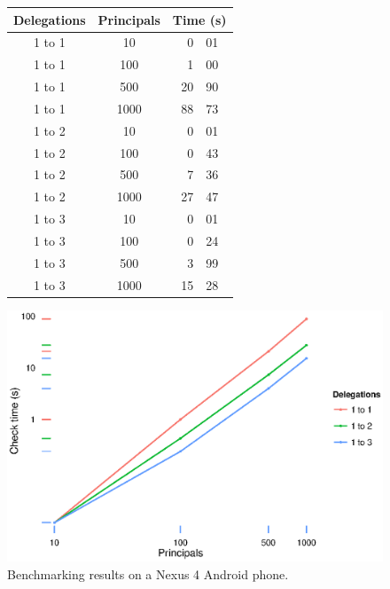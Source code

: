 \documentclass[]{llncs}
\begin{document}
\begin{figure}
  \centering
  \begin{minipage}{0.40\linewidth}
    \scriptsize
    \begin{tabular*}{0.80\linewidth}{c c r@{.}l}
      \toprule
      Delegations & Principals & \multicolumn{2}{c}{Time (s)} \\
      \midrule
      1 to 1 & 10   &  0&01 \\
      1 to 1 & 100  &  1&00 \\
      1 to 1 & 500  & 20&90 \\
      1 to 1 & 1000 & 88&73 \\
      \midrule
      1 to 2 & 10   &  0&01 \\
      1 to 2 & 100  &  0&43 \\
      1 to 2 & 500  &  7&36 \\
      1 to 2 & 1000 & 27&47 \\
      \midrule
      1 to 3 & 10   &  0&01 \\
      1 to 3 & 100  &  0&24 \\
      1 to 3 & 500  &  3&99 \\
      1 to 3 & 1000 & 15&28 \\
      \bottomrule
    \end{tabular*}
  \end{minipage}
  \begin{minipage}{0.59\linewidth}
    \includegraphics[width=\linewidth]{figures/benchmarks.eps}
  \end{minipage}
  \caption{Benchmarking results on a Nexus 4 Android phone.}
  \label{fig:benchmarks}
\end{figure}
\end{document}
